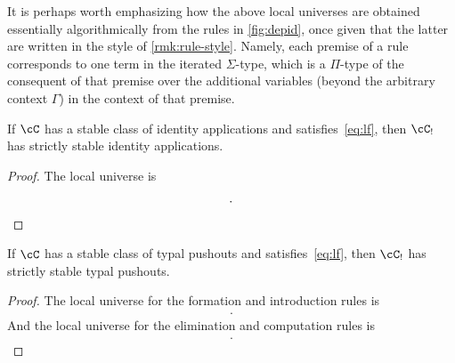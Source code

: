 \documentclass{amsart}
\let\C\cC
\let\Id\fId
\begin{document}
It is perhaps worth emphasizing how the above local universes are obtained essentially algorithmically from the rules in \cref{fig:depid}, once given that the latter are written in the style of \cref{rmk:rule-style}.
Namely, each premise of a rule corresponds to one term in the iterated $\Sigma$-type, which is a $\Pi$-type of the consequent of that premise over the additional variables (beyond the arbitrary context $\Gamma$) in the context of that premise.

\begin{thm}
  If $\C$ has a stable class of identity applications and satisfies~\eqref{eq:lf}, then $\C_!$ has strictly stable identity applications.
\end{thm}
\begin{proof}
  The local universe is
  \begin{align*}
    [ & a:V_A \\
    & b:\prod x:E_A(a). V_B,\\
    & f:\prod x:E_A(a). E_B(b(x)) ].\qedhere
  \end{align*}
\end{proof}

\begin{thm}\label{thm:lu-pushout}
  If $\C$ has a stable class of typal pushouts and satisfies~\eqref{eq:lf}, then $\C_!$ has strictly stable typal pushouts.
\end{thm}
\begin{proof}
  The local universe for the formation and introduction rules is
  \begin{align*}
    [ & a:V_A, b_1:V_{B_1}, b_2:V_{B_2}, \\
    &f_1: \prod x:E_A(a). E_{B_1}(b_1),\\
    &f_2: \prod x:E_A(a). E_{B_2}(b_2) ].
  \end{align*}
  And the local universe for the elimination and computation rules is
  \begin{align*}
    [ & a:V_A, b_1:V_{B_1}, b_2:V_{B_2}, \\
    &f_1: \prod x:E_A(a). E_{B_1}(b_1),\\
    &f_2: \prod x:E_A(a). E_{B_2}(b_2),\\
    &c : \prod u:E_{\fPush(f_1,f_2)}(a,b_1,b_2,f_1,f_2). V_C, \\
    &t_1 : \prod y_1:E_{B_1}(b_1). E_C(c(\nu_1(y_1))), \\
    &t_2 : \prod y_2:E_{B_2}(b_2). E_C(c(\nu_2(y_2))), \\
    &m : \prod x:E_A(a). \Id^{\fPush(f_1,f_2)}_C(a,b_1,b_2,f_1,f_2,c,\nu_1(f_1(x)),\nu_2(f_2(x)),\mu(x),t_1(f_1(x)),t_2(f_2(x)))
    ].%
  \end{align*}
\end{proof}
\end{document}
